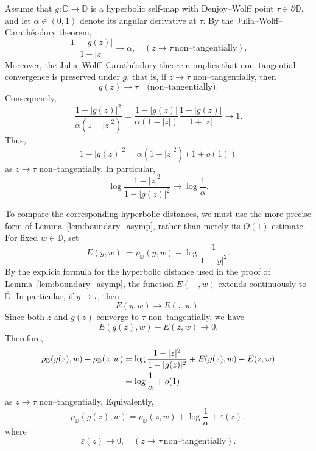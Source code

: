 \documentclass[10pt,a4paper]{amsart}
\numberwithin{equation}{section}
\begin{document}
Assume that $g:\mathbb{D}\to\mathbb{D}$ is a hyperbolic self-map with
Denjoy--Wolff point $\tau\in\partial\mathbb{D}$, and let
$\alpha\in(0,1)$ denote its angular derivative at $\tau$. By the
Julia--Wolff--Carath\'eodory theorem,
\begin{equation*}
\label{eq:jwc_radial_ratio}
\frac{1-|g(z)|}{1-|z|}
\longrightarrow \alpha,
\quad
(z\to\tau\ \text{non--tangentially}).
\end{equation*}
Moreover, the Julia--Wolff--Carath\'eodory theorem implies that
non--tangential convergence is preserved under $g$, that is, if
$z\to\tau$ non--tangentially, then
\begin{equation*}
g(z)\to\tau
\quad\text{(non--tangentially)}.
\end{equation*}
Consequently,
\begin{equation*}
\frac{1-|g(z)|^2}{\alpha(1-|z|^2)}
=
\frac{1-|g(z)|}{\alpha(1-|z|)}
\frac{1+|g(z)|}{1+|z|}
\longrightarrow1.
\end{equation*}
Thus,
\begin{equation*}
\label{eq:boundary_ratio_squared}
1-|g(z)|^2
=
\alpha(1-|z|^2)(1+o(1))
\end{equation*}
as $z\to\tau$ non--tangentially. In particular,
\begin{equation*}
\label{eq:log_boundary_ratio}
\log\frac{1-|z|^2}{1-|g(z)|^2}
\longrightarrow
\log\frac{1}{\alpha}.
\end{equation*}

To compare the corresponding hyperbolic distances, we must use the
more precise form of Lemma~\ref{lem:boundary_asymp}, rather than merely
its $O(1)$ estimate. For fixed $w\in\mathbb{D}$, set
\begin{equation*}
E(y,w)
:=
\rho_{\mathbb{D}}(y,w)
-
\log\frac{1}{1-|y|^2}.
\end{equation*}
By the explicit formula for the hyperbolic distance used in the proof
of Lemma~\ref{lem:boundary_asymp}, the function
$E(\,\cdot\,,w)$ extends continuously to $\overline{\mathbb{D}}$.
In particular, if $y\to\tau$, then
\begin{equation*}
E(y,w)\longrightarrow E(\tau,w).
\end{equation*}
Since both $z$ and $g(z)$ converge to $\tau$ non--tangentially, we have
\begin{equation*}
E(g(z),w)-E(z,w)\longrightarrow0.
\end{equation*}
Therefore,
\begin{align*}
\rho_{\mathbb{D}}(g(z),w)-\rho_{\mathbb{D}}(z,w)
&=
\log\frac{1-|z|^2}{1-|g(z)|^2}
+
E(g(z),w)-E(z,w) \notag\\
&=
\log\frac{1}{\alpha}+o(1)
\label{eq:single_step_rate}
\end{align*}
as $z\to\tau$ non--tangentially. Equivalently,
\begin{equation}
\label{eq:single_step_rate_equiv}
\rho_{\mathbb{D}}(g(z),w)
=
\rho_{\mathbb{D}}(z,w)
+
\log\frac{1}{\alpha}
+
\varepsilon(z),
\end{equation}
where
\begin{equation*}
\varepsilon(z)\longrightarrow0,
\quad
(z\to\tau\ \text{non--tangentially}).
\end{equation*}
\end{document}
